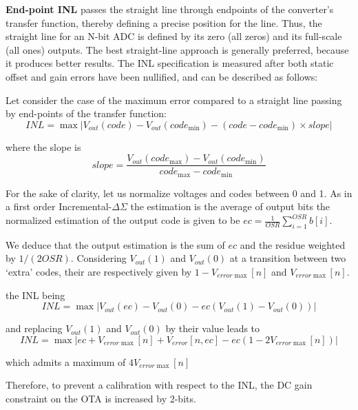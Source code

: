 \textbf{End-point INL} passes the straight line through endpoints of the converter's transfer function, thereby defining a precise position for the line. Thus, the straight line for an N-bit ADC is defined by its zero (all zeros) and its full-scale (all ones) outputs.
The best straight-line approach is generally preferred, because it produces better results. The INL specification is measured after both static offset and gain errors have been nullified, and can be described as follows:

Let consider the case of the maximum error compared to a straight line passing by end-points of the transfer function:
\begin{equation}
    INL = \max \left| V_{out}(code)-V_{out}(code_{\min}) - (code-code_{\min}) \times slope  \right|
\end{equation}

where the slope is 
\begin{equation}
    slope = \frac{V_{out}(code_{\max})-V_{out}(code_{\min})}{code_{\max}-code_{\min}}
\end{equation}

For the sake of clarity, let us normalize voltages and codes between 0 and 1. As in a first order Incremental-\(\Delta\Sigma \) the estimation is the average of output bits the normalized estimation of the output code is given to be \(ec = \frac{1}{OSR}\sum_{i=1}^{OSR} b[i] \). 

We deduce that the output estimation is the sum of $ec$ and the residue weighted by \(1/(2 OSR)\).  Considering \(V_{out}(1) \) and \(V_{out}(0) \) at a transition between two `extra' codes, their are respectively given by \(1-V_{error\max}[n] \) and \(V_{error\max}[n] \).

the INL being
\begin{equation}
    INL = \max \left| V_{out}(ec)-V_{out}(0) - ec (V_{out}(1)-V_{out}(0))  \right|
\end{equation}

and replacing \(V_{out}(1) \) and \(V_{out}(0)\) by their value leads to
\begin{equation}
    INL = \max \left| ec + V_{error\max } [n] + V_{error}[n, ec] - ec (1 - 2 V_{error\max }[n])  \right|
\end{equation}

which admits a maximum of \(4 V_{error\max }[n] \)

Therefore, to prevent a calibration with respect to the INL, the DC gain constraint on the OTA is increased by 2-bits.
